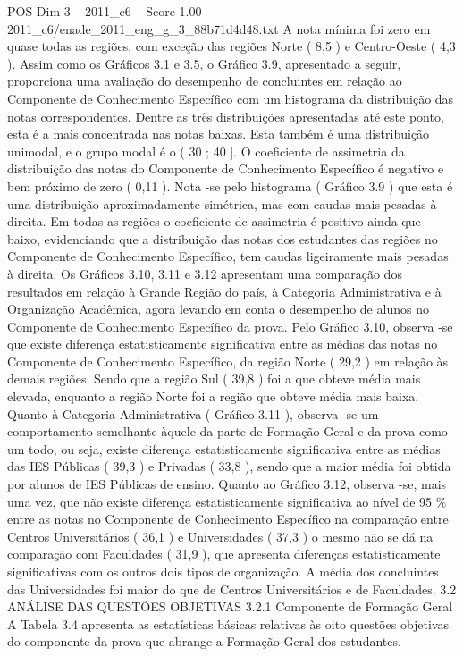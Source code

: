 \begin{textsample}{POS Dim 3 – 2011\_c6 – Score 1.00 – 2011\_c6/enade\_2011\_eng\_g\_3\_88b71d4d48.txt}
A nota mínima foi zero em quase todas as regiões, com exceção das regiões Norte ( 8,5 ) e Centro-Oeste ( 4,3 ).
Assim como os Gráficos 3.1 e 3.5, o Gráfico 3.9, apresentado a seguir, proporciona uma avaliação do desempenho de concluintes em relação ao Componente de Conhecimento Específico com um histograma da distribuição das notas correspondentes.
Dentre as três distribuições apresentadas até este ponto, esta é a mais concentrada nas notas baixas.
Esta também é uma distribuição unimodal, e o grupo modal é o ( 30 ; 40 ].
O coeficiente de assimetria da distribuição das notas do Componente de Conhecimento Específico é negativo e bem próximo de zero ( 0,11 ).
Nota -se pelo histograma ( Gráfico 3.9 ) que esta é uma distribuição aproximadamente simétrica, mas com caudas mais pesadas à direita.
Em todas as regiões o coeficiente de assimetria é positivo ainda que baixo, evidenciando que a distribuição das notas dos estudantes das regiões no Componente de Conhecimento Específico, tem caudas ligeiramente mais pesadas à direita.
Os Gráficos 3.10, 3.11 e 3.12 apresentam uma comparação dos resultados em relação à Grande Região do país, à Categoria Administrativa e à Organização Acadêmica, agora levando em conta o desempenho de alunos no Componente de Conhecimento Específico da prova.
Pelo Gráfico 3.10, observa -se que existe diferença estatisticamente significativa entre as médias das notas no Componente de Conhecimento Específico, da região Norte ( 29,2 ) em relação às demais regiões.
Sendo que a região Sul ( 39,8 ) foi a que obteve média mais elevada, enquanto a região Norte foi a região que obteve média mais baixa.
Quanto à Categoria Administrativa ( Gráfico 3.11 ), observa -se um comportamento semelhante àquele da parte de Formação Geral e da prova como um todo, ou seja, existe diferença estatisticamente significativa entre as médias das IES Públicas ( 39,3 ) e Privadas ( 33,8 ), sendo que a maior média foi obtida por alunos de IES Públicas de ensino.
Quanto ao Gráfico 3.12, observa -se, mais uma vez, que não existe diferença estatisticamente significativa ao nível de 95 \% entre as notas no Componente de Conhecimento Específico na comparação entre Centros Universitários ( 36,1 ) e Universidades ( 37,3 ) o mesmo não se dá na comparação com Faculdades ( 31,9 ), que apresenta diferenças estatisticamente significativas com os outros dois tipos de organização.
A média dos concluintes das Universidades foi maior do que de Centros Universitários e de Faculdades. 3.2 ANÁLISE DAS QUESTÕES OBJETIVAS 3.2.1 Componente de Formação Geral A Tabela 3.4 apresenta as estatísticas básicas relativas às oito questões objetivas do componente da prova que abrange a Formação Geral dos estudantes.

\end{textsample}
